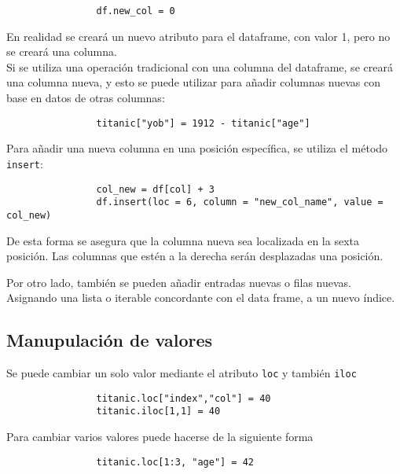             \begin{verbatim}
                df.new_col = 0
            \end{verbatim}

            En realidad se creará un nuevo atributo para el dataframe, con valor 1, pero no se creará una columna.\\

            Si se utiliza una operación tradicional con una columna del dataframe, se creará una columna nueva, y esto se puede utilizar para añadir columnas nuevas con base en datos de otras columnas:

            \begin{verbatim}
                titanic["yob"] = 1912 - titanic["age"]
            \end{verbatim}

            Para añadir una nueva columna en una posición específica, se utiliza el método \texttt{insert}:

            \begin{verbatim}
                col_new = df[col] + 3
                df.insert(loc = 6, column = "new_col_name", value = col_new)
            \end{verbatim}

            De esta forma se asegura que la columna nueva sea localizada en la sexta posición. Las columnas que estén a la derecha serán desplazadas una posición.

            Por otro lado, también se pueden añadir entradas nuevas o filas nuevas. Asignando una lista o iterable concordante con el data frame, a un nuevo índice.



        \subsection{Manupulación de valores}

            Se puede cambiar un solo valor mediante el atributo \texttt{loc} y también \texttt{iloc}

            \begin{verbatim}
                titanic.loc["index","col"] = 40
                titanic.iloc[1,1] = 40
            \end{verbatim}

            \noindent Para cambiar varios valores puede hacerse de la siguiente forma

            \begin{verbatim}
                titanic.loc[1:3, "age"] = 42
            \end{verbatim}

